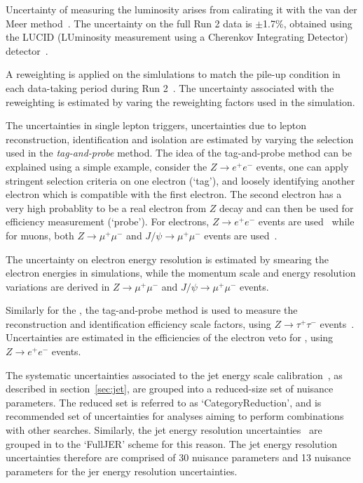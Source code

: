 Uncertainty of measuring the luminosity 
arises from calirating it with the van der Meer method~\cite{DAPR-2013-01}.
The uncertainty on the full Run 2 data is $\pm$1.7\%, obtained using the
LUCID (LUminosity measurement using a Cherenkov Integrating Detector)
detector~\cite{ATLAS-Lumi2}.

A reweighting is applied on the simlulations to match 
the pile-up condition in each data-taking period during Run 2~\cite{STDM-2015-05}. 
The uncertainty associated with the reweighting
is estimated by varing the reweighting factors used in the simulation. 

The uncertainties in single lepton triggers, 
uncertainties due to lepton reconstruction, identification and
isolation are estimated by varying the selection used in the
\textit{tag-and-probe} method. 
The idea of the tag-and-probe method can be explained using a simple example,
consider the $Z \rightarrow e^+ e^-$ events, one can apply stringent selection
criteria on one electron (`tag'), and loosely identifying another electron 
which is compatible with the first electron. The second electron has a very 
high probablity to be a real electron from $Z$ decay and can then be used 
for efficiency measurement (`probe'). 
For electrons, $Z\rightarrow e^+e^-$ events 
are used~\cite{EGAM-2018-01} while for muons, 
both $Z\rightarrow \mu^+\mu^-$  and $J/\psi\rightarrow \mu^+\mu^-$ events
are used~\cite{CERN-EP-2020-199}. 


The uncertainty on electron energy resolution is estimated by smearing the
electron energies in simulations, while 
the momentum scale and energy resolution variations are derived in 
$Z\rightarrow \mu^+\mu^-$  and $J/\psi\rightarrow \mu^+\mu^-$ events. 

Similarly for the \tauhad, the tag-and-probe method is used
to measure the reconstruction and identification efficiency scale factors,
using $Z\rightarrow \tau^+\tau^-$ events~\cite{ATLAS-CONF-2017-029}.  
Uncertainties are estimated in the efficiencies of the electron veto for
\tauhad, using $Z\rightarrow e^+e^-$ events. 


The systematic uncertainties associated to the jet energy scale
calibration~\cite{JETM-2018-05}, 
as described in section~\ref{sec:jet}, are grouped into
a reduced-size set of nuisance parameters.
The reduced set is referred to as `CategoryReduction', 
and is recommended set of uncertainties for analyses
aiming to perform combinations with other searches. 
Similarly, the jet energy resolution uncertainties~\cite{JETM-2018-05}
are grouped in to the `FullJER' scheme for this reason.
The jet energy resolution uncertainties therefore are 
comprised of 30 nuisance parameters 
and 13 nuisance parameters for the jer energy resolution uncertainties. 

